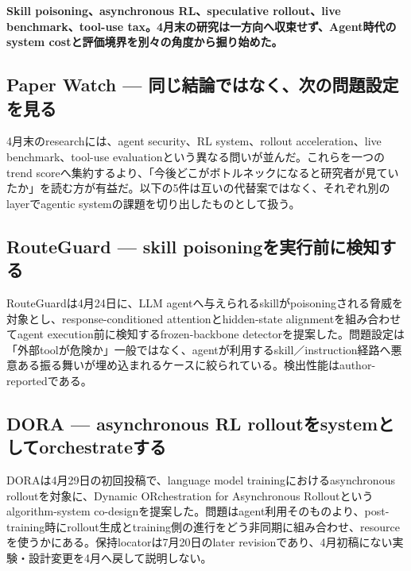 \noindent\textbf{Skill poisoning、asynchronous RL、speculative rollout、live benchmark、tool-use tax。4月末の研究は一方向へ収束せず、Agent時代のsystem costと評価境界を別々の角度から掘り始めた。}\autocite{src-0d99a9f2485e,src-56e226358d6f,src-6bd60c76cba7,src-841d4b563b9d,src-8e578daed9ed}

\subsection{Paper Watch — 同じ結論ではなく、次の問題設定を見る}

4月末のresearchには、agent security、RL system、rollout acceleration、live benchmark、tool-use evaluationという異なる問いが並んだ。これらを一つのtrend scoreへ集約するより、「今後どこがボトルネックになると研究者が見ていたか」を読む方が有益だ。以下の5件は互いの代替案ではなく、それぞれ別のlayerでagentic systemの課題を切り出したものとして扱う。\autocite{src-0d99a9f2485e,src-56e226358d6f,src-6bd60c76cba7,src-841d4b563b9d,src-8e578daed9ed}


\subsection{RouteGuard — skill poisoningを実行前に検知する}

RouteGuardは4月24日に、LLM agentへ与えられるskillがpoisoningされる脅威を対象とし、response-conditioned attentionとhidden-state alignmentを組み合わせてagent execution前に検知するfrozen-backbone detectorを提案した。問題設定は「外部toolが危険か」一般ではなく、agentが利用するskill／instruction経路へ悪意ある振る舞いが埋め込まれるケースに絞られている。検出性能はauthor-reportedである。\autocite{src-0d99a9f2485e}


\subsection{DORA — asynchronous RL rolloutをsystemとしてorchestrateする}

DORAは4月29日の初回投稿で、language model trainingにおけるasynchronous rolloutを対象に、Dynamic ORchestration for Asynchronous Rolloutというalgorithm-system co-designを提案した。問題はagent利用そのものより、post-training時にrollout生成とtraining側の進行をどう非同期に組み合わせ、resourceを使うかにある。保持locatorは7月20日のlater revisionであり、4月初稿にない実験・設計変更を4月へ戻して説明しない。\autocite{src-6bd60c76cba7}



